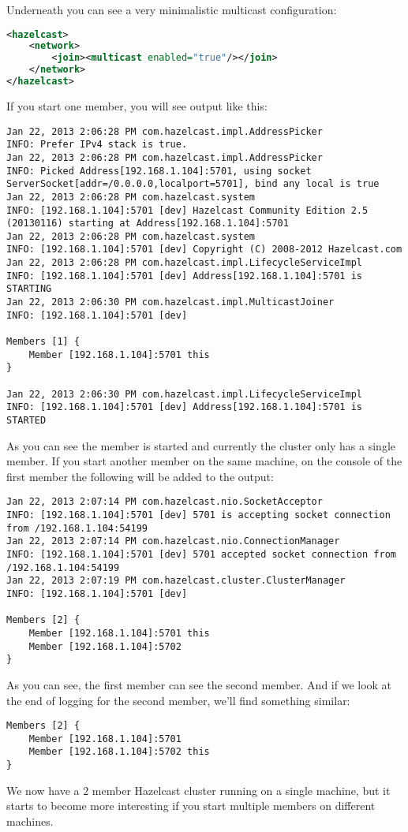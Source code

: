 Underneath you can see a very minimalistic multicast configuration:
\begin{lstlisting}[language=xml]
<hazelcast>
    <network>
        <join><multicast enabled="true"/></join>
    </network>
</hazelcast>
\end{lstlisting}
If you start one member, you will see output like this:
\begin{lstlisting}
Jan 22, 2013 2:06:28 PM com.hazelcast.impl.AddressPicker
INFO: Prefer IPv4 stack is true.
Jan 22, 2013 2:06:28 PM com.hazelcast.impl.AddressPicker
INFO: Picked Address[192.168.1.104]:5701, using socket ServerSocket[addr=/0.0.0.0,localport=5701], bind any local is true
Jan 22, 2013 2:06:28 PM com.hazelcast.system
INFO: [192.168.1.104]:5701 [dev] Hazelcast Community Edition 2.5 (20130116) starting at Address[192.168.1.104]:5701
Jan 22, 2013 2:06:28 PM com.hazelcast.system
INFO: [192.168.1.104]:5701 [dev] Copyright (C) 2008-2012 Hazelcast.com
Jan 22, 2013 2:06:28 PM com.hazelcast.impl.LifecycleServiceImpl
INFO: [192.168.1.104]:5701 [dev] Address[192.168.1.104]:5701 is STARTING
Jan 22, 2013 2:06:30 PM com.hazelcast.impl.MulticastJoiner
INFO: [192.168.1.104]:5701 [dev] 

Members [1] {
	Member [192.168.1.104]:5701 this
}

Jan 22, 2013 2:06:30 PM com.hazelcast.impl.LifecycleServiceImpl
INFO: [192.168.1.104]:5701 [dev] Address[192.168.1.104]:5701 is STARTED
\end{lstlisting}	
As you can see the member is started and currently the cluster only has a single member. If you start another member on the same machine, on the console of the first member the following will be added to the output:
\begin{lstlisting}
Jan 22, 2013 2:07:14 PM com.hazelcast.nio.SocketAcceptor
INFO: [192.168.1.104]:5701 [dev] 5701 is accepting socket connection from /192.168.1.104:54199
Jan 22, 2013 2:07:14 PM com.hazelcast.nio.ConnectionManager
INFO: [192.168.1.104]:5701 [dev] 5701 accepted socket connection from /192.168.1.104:54199
Jan 22, 2013 2:07:19 PM com.hazelcast.cluster.ClusterManager
INFO: [192.168.1.104]:5701 [dev] 

Members [2] {
	Member [192.168.1.104]:5701 this
	Member [192.168.1.104]:5702
}
\end{lstlisting}	
As you can see, the first member can see the second member. And if we look at the end of logging for the second member, we'll find something similar:
\begin{lstlisting}
Members [2] {
	Member [192.168.1.104]:5701
	Member [192.168.1.104]:5702 this
}
\end{lstlisting}		
We now have a 2 member Hazelcast cluster running on a single machine, but it starts to become more interesting if you start multiple members on different machines.

